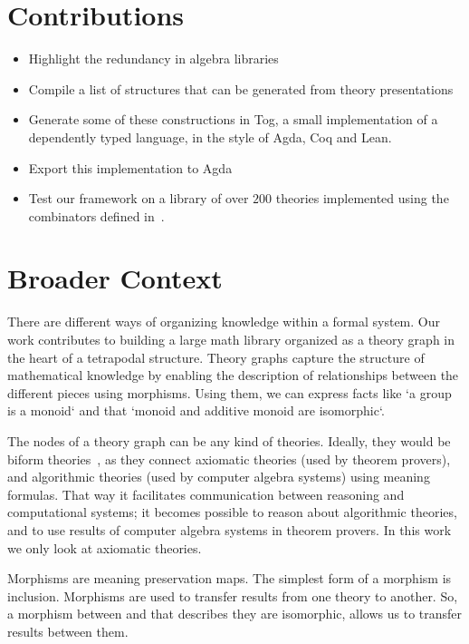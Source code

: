 \section{Contributions}
\begin{itemize}
    \item Highlight the redundancy in algebra libraries 
    \item Compile a list of structures that can be generated from theory presentations
    \item Generate some of these constructions in Tog, a small implementation of a dependently typed language, in the style of Agda, Coq and Lean. 
    \item Export this implementation to Agda 
    \item Test our framework on a library of over $200$ theories implemented using the combinators defined in~\cite{carette2018building}. 
\end{itemize}  

\section{Broader Context}
\label{sec:broader_context}
There are different ways of organizing knowledge within a formal system. Our work contributes to building a large math library organized as a theory graph in the heart of a tetrapodal structure. Theory graphs capture the structure of mathematical knowledge by enabling the description of relationships between the different pieces using morphisms. Using them, we can express facts like `a group is a monoid` and that `monoid and additive monoid are isomorphic`. 

The nodes of a theory graph can be any kind of theories. Ideally, they would be biform theories~\cite{biformCICM2018}, as they connect axiomatic theories (used by theorem provers), and algorithmic theories (used by computer algebra systems) using meaning formulas. That way it facilitates communication between reasoning and computational systems; it becomes possible to reason about algorithmic theories, and to use results of computer algebra systems in theorem provers. In this work we only look at axiomatic theories. 

Morphisms are meaning preservation maps. The simplest form of a morphism is inclusion. Morphisms are used to transfer results from one theory to another. So, a morphism between  and  that describes they are isomorphic, allows us to transfer results between them. 

